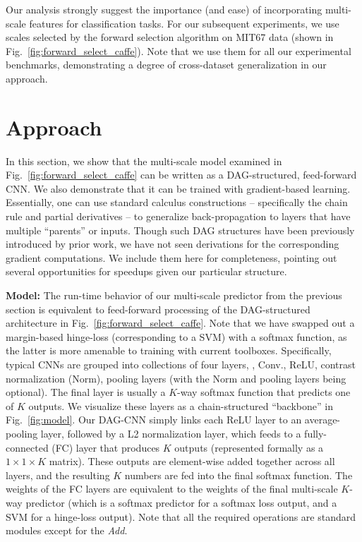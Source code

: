 \documentclass[10pt,twocolumn,letterpaper]{article}
\begin{document}
Our analysis strongly suggest the importance (and ease) of incorporating multi-scale features for classification tasks. For our subsequent experiments, we use scales selected by the forward selection algorithm on MIT67 data (shown in Fig.~\ref{fig:forward_select_caffe}). Note that we use them for all our experimental benchmarks, demonstrating a degree of cross-dataset generalization in our approach. 

\section{Approach\label{sec:approach}} 

In this section, we show that the multi-scale model examined in Fig.~\ref{fig:forward_select_caffe} can be written as a DAG-structured, feed-forward CNN. We also demonstrate that it can be trained with gradient-based learning. Essentially, one can use standard calculus constructions -- specifically the chain rule and partial derivatives -- to generalize back-propagation to layers that have multiple ``parents'' or inputs. Though such DAG structures have been previously introduced by prior work, we have not seen derivations for the corresponding gradient computations. We include them here for completeness, pointing out several opportunities for speedups given our particular structure.

{\bf Model:} The run-time behavior of our multi-scale predictor from the previous section is equivalent to feed-forward processing of the DAG-structured architecture in Fig.~\ref{fig:forward_select_caffe}. Note that we have swapped out a margin-based hinge-loss (corresponding to a SVM) with a softmax function, as the latter is more amenable to training with current toolboxes. Specifically, typical CNNs are grouped into collections of four layers, \ie, Conv., ReLU, contrast normalization (Norm), pooling layers (with the Norm and pooling layers being optional). The final layer is usually a $K$-way softmax function that predicts one of $K$ outputs. We visualize these layers as a chain-structured ``backbone'' in Fig.~\ref{fig:model}. Our DAG-CNN simply links each ReLU layer to an average-pooling layer, followed by a L2 normalization layer, which feeds to a fully-connected (FC) layer that produces $K$ outputs (represented formally as a $1 \times 1 \times K$ matrix). These outputs are element-wise added together across all layers, and the resulting $K$ numbers are fed into the final softmax function. The weights of the FC layers are equivalent to the weights of the final multi-scale $K$-way predictor (which is a softmax predictor for a softmax loss output, and a SVM for a hinge-loss output). Note that all the required operations are standard modules except for the \textit{Add}.
\end{document}
